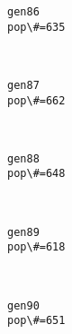 \documentclass[11pt]{article}
\begin{document}
    \begin{Verbatim}[commandchars=\\\{\}]
gen86
pop\#=635

    \end{Verbatim}

    \begin{center}
    \end{center}
    { \hspace*{\fill} \\}
    
    \begin{Verbatim}[commandchars=\\\{\}]
gen87
pop\#=662

    \end{Verbatim}

    \begin{center}
    \end{center}
    { \hspace*{\fill} \\}
    
    \begin{Verbatim}[commandchars=\\\{\}]
gen88
pop\#=648

    \end{Verbatim}

    \begin{center}
    \end{center}
    { \hspace*{\fill} \\}
    
    \begin{Verbatim}[commandchars=\\\{\}]
gen89
pop\#=618

    \end{Verbatim}

    \begin{center}
    \end{center}
    { \hspace*{\fill} \\}
    
    \begin{Verbatim}[commandchars=\\\{\}]
gen90
pop\#=651

    \end{Verbatim}
\end{document}
